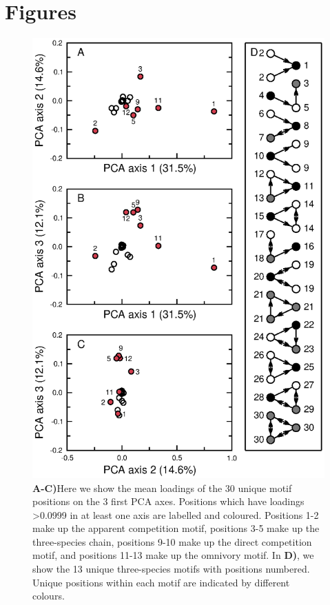 \documentclass[12pt]{article}
\begin{document}

\section{Figures}

	\begin{figure}[h!]
		\caption{\textbf{A-C)}Here we show the mean loadings of the 30 unique motif positions on the 3 first PCA axes. Positions which have loadings \textgreater0.0999 in at least one axis are labelled and coloured. Positions 1-2 make up the apparent competition motif, positions 3-5 make up the three-species chain, positions 9-10 make up the direct competition motif, and positions 11-13 make up the omnivory motif. 
		In \textbf{D)}, we show the 13 unique three-species motifs with positions numbered. Unique positions within each motif are indicated by different colours.}
		\label{PCA_plots}
		\includegraphics[height=.75\textheight]{figures/roles/roleplot_paper_points.eps}

	\end{figure}
			
\end{document}
